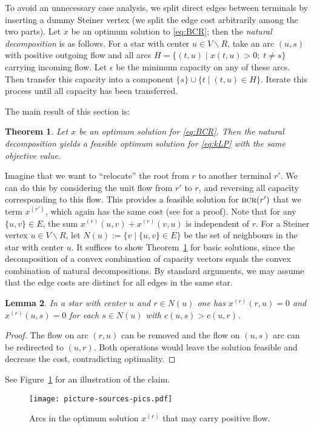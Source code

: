 \documentclass[11pt, letterpaper]{article}
\newtheorem{theorem}{Theorem}[section]
\newtheorem{lemma}[theorem]{Lemma}
\theoremstyle{definition}
\newcommand{\todo}[1]{}
\newcommand{\todo}[1]{{\color{blue}\emph{(#1)}}}
\begin{document}
To avoid an unnecessary case analysis, we split direct edges between terminals 
by inserting a dummy Steiner vertex (we split the edge cost arbitrarily 
among the two parts).
Let $x$ be an optimum solution to \eqref{eq:BCR};
then the \emph{natural decomposition} is as follows. For a star with center $u \in V\backslash R$, take an arc $(u,s)$ 
with positive outgoing flow and all arcs $H = \{ (t,u) \mid x(t,u) > 0; \; t\neq s \}$
carrying incoming flow. Let $\epsilon$ be the minimum capacity on 
any of these arcs. Then transfer this capacity into a component $\{ s\} \cup \{ t \mid (t,u) \in H\}$. 
Iterate this process until all capacity has been transferred. 
\todo{This should be expanded slightly.}
The main result of this section is:
\begin{theorem} \label{thm:NaturalDecomposition}
Let $x$ be an optimum solution for \eqref{eq:BCR}. Then the natural decomposition 
yields a feasible optimum solution for \eqref{eq:kLP} with the same objective value.
\end{theorem}


Imagine that we want to ``relocate'' the
root from $r$ to another terminal $r'$. 
We can do this by considering the unit flow from
$r'$ to $r$, and reversing all capacity corresponding to this flow.
This provides a feasible
solution for ${\textsc{bcr}}(r')$ that we term $x^{(r')}$, which again has the same cost (see \cite{GM93} for a proof). 
Note that for any $\{ u,v\} \in E$, the sum $x^{(r)}(u,v) + x^{(r)}(v,u)$ is independent of $r$.
For a Steiner vertex $u \in V \backslash R$, let $N(u) := \{ v \mid \{ u,v\} \in E\}$ be the set of neighbours in the
star with center $u$. It suffices to show Theorem~\ref{thm:NaturalDecomposition} for basic solutions, since the
decomposition of a convex combination of capacity vectors equals the 
convex combination of natural decompositions. 
By standard arguments, we may assume that the edge costs are distinct for all edges in the
same star. 

\begin{lemma}\label{lem:BCRincomingflow}
In a star with center $u$ and $r \in N(u)$ one has  $x^{(r)}(r,u) = 0$  and $x^{(r)}(u,s) = 0$ 
for each $s \in N(u)$ with $c(u,s) > c(u,r)$.
\end{lemma}
\begin{proof} 
The flow on arc $(r,u)$ can be removed and the flow on $(u,s)$ arc can be redirected to
$(u,r)$. Both operations would leave the solution feasible and decrease the cost, contradicting optimality. 
\end{proof}
See Figure~\ref{fig:PositiveFlowInBCRStar} for an illustration of the claim.
\begin{figure}[H]
\begin{center}
\texttt{[image: picture-sources-pics.pdf]}
\caption{Arcs in the optimum solution $x^{(r)}$ that may carry positive flow. \label{fig:PositiveFlowInBCRStar}}
\end{center}
\end{figure}
\end{document}
